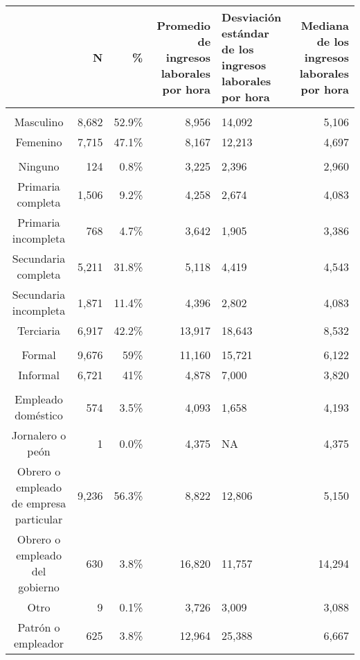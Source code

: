 \begin{table}[t]
\fontsize{12.0pt}{14.4pt}\selectfont
\begin{tabular*}{\linewidth}{@{\extracolsep{\fill}}crrrlr}
\toprule
  & N & \% & Promedio de ingresos laborales por hora & Desviación estándar de los ingresos laborales por hora & Mediana de los ingresos laborales por hora \\ 
\midrule\addlinespace[2.5pt]
\multicolumn{6}{l}{{\bfseries Sexo}} \\[2.5pt] 
\midrule\addlinespace[2.5pt]
Masculino & 8,682 & 52.9\% & 8,956 & 14,092 & 5,106 \\ 
Femenino & 7,715 & 47.1\% & 8,167 & 12,213 & 4,697 \\ 
\midrule\addlinespace[2.5pt]
\multicolumn{6}{l}{{\bfseries Máximo nivel educativo}} \\[2.5pt] 
\midrule\addlinespace[2.5pt]
Ninguno &   124 &  0.8\% &  3,225 &  2,396 & 2,960 \\ 
Primaria completa & 1,506 &  9.2\% &  4,258 &  2,674 & 4,083 \\ 
Primaria incompleta &   768 &  4.7\% &  3,642 &  1,905 & 3,386 \\ 
Secundaria completa & 5,211 & 31.8\% &  5,118 &  4,419 & 4,543 \\ 
Secundaria incompleta & 1,871 & 11.4\% &  4,396 &  2,802 & 4,083 \\ 
Terciaria & 6,917 & 42.2\% & 13,917 & 18,643 & 8,532 \\ 
\midrule\addlinespace[2.5pt]
\multicolumn{6}{l}{{\bfseries Formalidad}} \\[2.5pt] 
\midrule\addlinespace[2.5pt]
Formal & 9,676 & 59\% & 11,160 & 15,721 & 6,122 \\ 
Informal & 6,721 & 41\% &  4,878 &  7,000 & 3,820 \\ 
\midrule\addlinespace[2.5pt]
\multicolumn{6}{l}{{\bfseries Posición Ocupacional}} \\[2.5pt] 
\midrule\addlinespace[2.5pt]
Empleado doméstico &   574 &  3.5\% &  4,093 &  1,658 &  4,193 \\ 
Jornalero o peón &     1 &  0.0\% &  4,375 &     NA &  4,375 \\ 
Obrero o empleado de empresa particular & 9,236 & 56.3\% &  8,822 & 12,806 &  5,150 \\ 
Obrero o empleado del gobierno &   630 &  3.8\% & 16,820 & 11,757 & 14,294 \\ 
Otro &     9 &  0.1\% &  3,726 &  3,009 &  3,088 \\ 
Patrón o empleador &   625 &  3.8\% & 12,964 & 25,388 &  6,667 \\ 

\end{tabular*}
\end{table}

